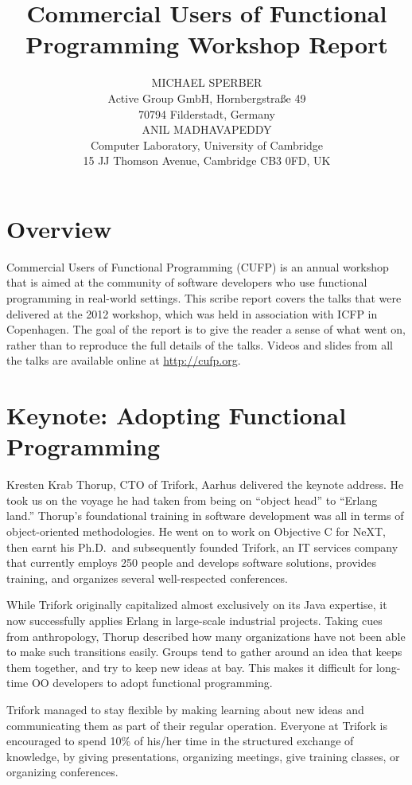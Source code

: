 \documentclass{jfp1}
\title[Commercial Users of Functional Programming 2012]
      {Commercial Users of Functional Programming Workshop Report}
\author[Michael Sperber and Anil Madhavapeddy]
       {MICHAEL SPERBER\\
         Active Group GmbH, Hornbergstra\ss{}e 49\\
         70794 Filderstadt, Germany\\
         ANIL MADHAVAPEDDY\\
        Computer Laboratory, University of Cambridge\\ 
        15 JJ Thomson Avenue, Cambridge CB3 0FD, UK}
\begin{document}
\label{firstpage}
\maketitle

\section{Overview}

Commercial Users of Functional Programming (CUFP) is an annual workshop
that is aimed at the community of software developers who use functional
programming in real-world settings.  This scribe report covers the talks
that were delivered at the 2012 workshop, which was held in association
with ICFP in Copenhagen.  The goal of the report is to give the reader
a sense of what went on, rather than to reproduce the full details
of the talks.  Videos and slides from all the talks are available online at \url{http://cufp.org}.

\section{Keynote: Adopting Functional Programming}

Kresten Krab Thorup, CTO of Trifork, Aarhus delivered the keynote address.
He took us on the voyage he had taken from being on ``object head''
to ``Erlang land.''  Thorup's foundational training in software
development was all in terms of object-oriented methodologies.  He
went on to work on Objective C for NeXT, then earnt his Ph.D.\
and subsequently founded Trifork, an IT services company that currently
employs 250 people and develops software solutions, provides training, and
organizes several well-respected conferences.

While Trifork originally capitalized almost exclusively on its Java
expertise, it now successfully applies Erlang in large-scale
industrial projects.  Taking cues from
anthropology, Thorup described how many organizations have not been able to make such transitions
easily. Groups tend to gather around an idea that keeps them together,
and try to keep new ideas at bay.  This makes it difficult for
long-time OO developers to adopt functional programming.

Trifork managed to stay flexible by making learning about new ideas
and communicating them as part of their regular operation.  Everyone at
Trifork is encouraged to spend 10\% of his/her time in the structured
exchange of knowledge, by giving presentations, organizing meetings,
give training classes, or organizing conferences.
\end{document}
